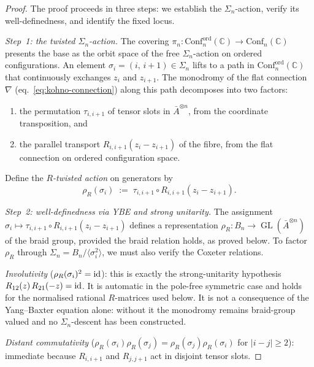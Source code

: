 \begin{proof}
The proof proceeds in three steps: we establish the
$\Sigma_n$-action, verify its well-definedness, and identify
the fixed locus.

\emph{Step~1: the twisted $\Sigma_n$-action.}
The covering $\pi_n\colon\mathrm{Conf}_n^{\mathrm{ord}}(\mathbb{C})
\to\mathrm{Conf}_n(\mathbb{C})$ presents the base as the orbit space
of the free $\Sigma_n$-action on ordered configurations. An element
$\sigma_i=(i,\,i{+}1)\in\Sigma_n$ lifts to a path in
$\mathrm{Conf}_n^{\mathrm{ord}}(\mathbb{C})$ that continuously
exchanges $z_i$ and $z_{i+1}$. The monodromy of the flat connection
$\nabla$ (eq.~\eqref{eq:kohno-connection}) along this path decomposes
into two factors:
\begin{enumerate}[label=(\roman*)]
\item the permutation $\tau_{i,i+1}$ of tensor slots in
 $\bar A^{\otimes n}$, from the coordinate transposition, and
\item the parallel transport $R_{i,i+1}(z_i-z_{i+1})$ of the fibre,
 from the flat connection on ordered configuration space.
\end{enumerate}
Define the \emph{$R$-twisted action} on generators by
\begin{equation}\label{eq:r-twisted-action}
\rho_R(\sigma_i)
\;:=\;
\tau_{i,i+1}\circ R_{i,i+1}(z_i-z_{i+1}).
\end{equation}

\emph{Step~2: well-definedness via YBE and strong unitarity.}
The assignment
\(\sigma_i\mapsto\tau_{i,i+1}\circ R_{i,i+1}(z_i-z_{i+1})\)
defines a representation
$\rho_R\colon B_n\to\operatorname{GL}(\bar A^{\otimes n})$
of the braid group, provided the braid relation holds, as proved below.
To factor $\rho_R$ through $\Sigma_n=B_n/\langle\sigma_i^2\rangle$,
we must also verify the Coxeter relations.

\emph{Involutivity} ($\rho_R(\sigma_i)^2=\mathrm{id}$):
this is exactly the strong-unitarity hypothesis
$R_{12}(z)\,R_{21}(-z)=\mathrm{id}$. It is automatic in the pole-free
symmetric case and holds for the normalised rational $R$-matrices used
below. It is not a consequence of the Yang--Baxter equation alone:
without it the monodromy remains braid-group valued and no
$\Sigma_n$-descent has been constructed.

\emph{Distant commutativity}
($\rho_R(\sigma_i)\rho_R(\sigma_j)
=\rho_R(\sigma_j)\rho_R(\sigma_i)$ for $|i-j|\geq 2$):
immediate because $R_{i,i+1}$ and $R_{j,j+1}$ act in disjoint
tensor slots.


\end{proof}
